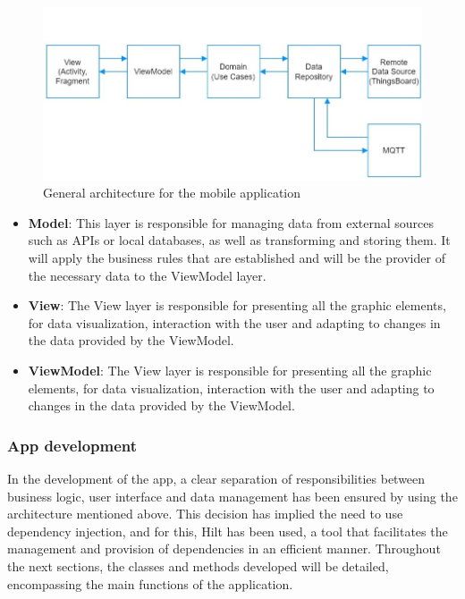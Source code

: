 \begin{figure}[H]
    \centering
    \includegraphics[width=1\textwidth]{./images/8/Diagrama.jpg}
    \caption{General architecture for the mobile application}
    \label{fig:mobileArch}
\end{figure}

\begin{itemize}
    \item \textbf{Model}: This layer is responsible for managing data from external sources such as APIs or local databases, as well as transforming and storing them. It will apply the business rules that are established and will be the provider of the necessary data to the ViewModel layer.
    \item \textbf{View}: The View layer is responsible for presenting all the graphic elements, for data visualization, interaction with the user and adapting to changes in the data provided by the ViewModel. 
    \item \textbf{ViewModel}: The View layer is responsible for presenting all the graphic elements, for data visualization, interaction with the user and adapting to changes in the data provided by the ViewModel. 
\end{itemize}

\subsubsection*{App development}
In the development of the app, a clear separation of responsibilities between business logic, user interface and data management 
has been ensured by using the architecture mentioned above. This decision has implied the need to use dependency injection, and for this, Hilt has been used, 
a tool that facilitates the management and provision of dependencies in an efficient manner. 
Throughout the next sections, the classes and methods developed will be detailed, encompassing the main functions of the application.

